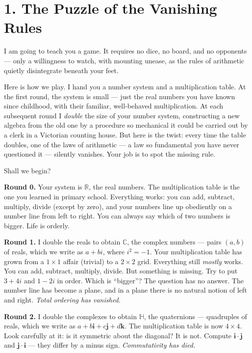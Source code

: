 

\section{1. The Puzzle of the Vanishing Rules}\label{ch9-the-puzzle-of-the-vanishing-rules}

I am going to teach you a game. It requires no dice, no board, and no opponents --- only a willingness to watch, with mounting unease, as the rules of arithmetic quietly disintegrate beneath your feet.

Here is how we play. I hand you a number system and a multiplication table. At the first round, the system is small --- just the real numbers you have known since childhood, with their familiar, well-behaved multiplication. At each subsequent round I \emph{double} the size of your number system, constructing a new algebra from the old one by a procedure so mechanical it could be carried out by a clerk in a Victorian counting house. But here is the twist: every time the table doubles, one of the laws of arithmetic --- a law so fundamental you have never questioned it --- silently vanishes. Your job is to spot the missing rule.

Shall we begin?

\textbf{Round 0.} Your system is \(\mathbb{R}\), the real numbers. The multiplication table is the one you learned in primary school. Everything works: you can add, subtract, multiply, divide (except by zero), and your numbers line up obediently on a number line from left to right. You can always say which of two numbers is bigger. Life is orderly.

\textbf{Round 1.} I double the reals to obtain \(\mathbb{C}\), the complex numbers --- pairs \((a, b)\) of reals, which we write as \(a + bi\), where \(i^2 = -1\). Your multiplication table has grown from a \(1 \times 1\) affair (trivial) to a \(2 \times 2\) grid. Everything still \emph{mostly} works. You can add, subtract, multiply, divide. But something is missing. Try to put \(3 + 4i\) and \(1 - 2i\) in order. Which is ``bigger''? The question has no answer. The number line has become a plane, and in a plane there is no natural notion of left and right. \emph{Total ordering has vanished.}

\textbf{Round 2.} I double the complexes to obtain \(\mathbb{H}\), the quaternions --- quadruples of reals, which we write as \(a + b\mathbf{i} + c\mathbf{j} + d\mathbf{k}\). The multiplication table is now \(4 \times 4\). Look carefully at it: is it symmetric about the diagonal? It is not. Compute \(\mathbf{i} \cdot \mathbf{j}\) and \(\mathbf{j} \cdot \mathbf{i}\) --- they differ by a minus sign. \emph{Commutativity has died.}

